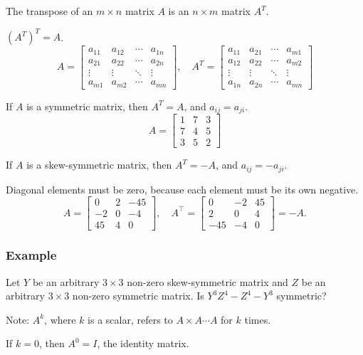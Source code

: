 \documentclass[../linear-algebra.tex]{subfiles}
\begin{document}
\noindent The transpose of an $m\times n$ matrix $A$ is an $n\times m$ matrix $A^T$.

\noindent $(A^T)^T = A$.
\[
A = \begin{bmatrix}
a_{11} & a_{12} & \cdots & a_{1n} \\
a_{21} & a_{22} & \cdots & a_{2n} \\
\vdots & \vdots & \ddots & \vdots \\
a_{m1} & a_{m2} & \cdots & a_{mn}
\end{bmatrix}, \quad
A^T = \begin{bmatrix}
a_{11} & a_{21} & \cdots & a_{m1} \\
a_{12} & a_{22} & \cdots & a_{m2} \\
\vdots & \vdots & \ddots & \vdots \\
a_{1n} & a_{2n} & \cdots & a_{mn}
\end{bmatrix}
\]

\noindent If $A$ is a symmetric matrix, then $A^T = A$, and $a_{ij} = a_{ji}$.
\[
A = \begin{bmatrix}
1 & 7 & 3 \\
7 & 4 & 5 \\
3 & 5 & 2
\end{bmatrix}
\]

\noindent If $A$ is a skew-symmetric matrix, then $A^T = -A$, and $a_{ij} = -a_{ji}$.

\noindent Diagonal elements must be zero, because each element must be its own negative.
\[
A = \begin{bmatrix}
0 & 2 & -45 \\
-2 & 0 & -4 \\
45 & 4 & 0
\end{bmatrix}, \quad
A^\top = \begin{bmatrix}
0 & -2 & 45 \\
2 & 0 & 4 \\
-45 & -4 & 0
\end{bmatrix} = -A.
\]

\subsubsection{Example}
Let $Y$ be an arbitrary $3\times3$ non-zero skew-symmetric matrix and $Z$ be
an arbitrary $3\times3$ non-zero symmetric matrix. Is $Y^3Z^4-Z^4-Y^3$ symmetric?

\noindent Note: $A^k$, where $k$ is a scalar, refers to $A\times A \cdots A$ for $k$ times.

\noindent If $k=0$, then $A^0 = I$, the identity matrix.
\end{document}
